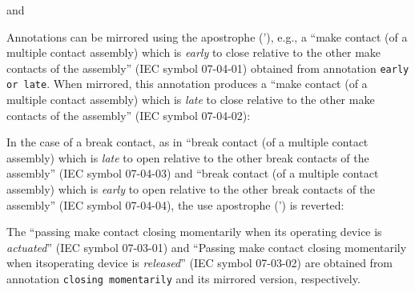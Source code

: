 \documentclass[a4paper]{ltxdoc}
\begin{document}
\noindent{}and

\begin{center}
\end{center}

Annotations can be mirrored using the apostrophe ('), e.g., a ``make contact (of a multiple contact assembly) which is \emph{early} to close relative to the other make contacts of the assembly'' (IEC symbol 07-04-01) obtained from annotation \verb|early or late|. When mirrored, this annotation produces a ``make contact (of a multiple contact assembly) which is \emph{late} to close relative to the other make contacts of the assembly'' (IEC symbol 07-04-02):
\begin{codeexample}[width=1.7cm]
\end{codeexample}

In the case of a break contact, as in ``break contact (of a multiple contact assembly) which is \emph{late} to open relative to the other break contacts of the assembly'' (IEC symbol 07-04-03) and ``break contact (of a multiple contact assembly) which is \emph{early} to open relative to the other break contacts of the assembly'' (IEC symbol 07-04-04), the use apostrophe (') is reverted:
\begin{codeexample}[width=1.7cm]
\end{codeexample}

The ``passing make contact closing momentarily when its operating device is \emph{actuated}'' (IEC symbol 07-03-01) and ``Passing make contact closing momentarily when itsoperating device is \emph{released}'' (IEC symbol 07-03-02) are obtained from annotation \verb|closing momentarily| and its mirrored version, respectively.
\end{document}
